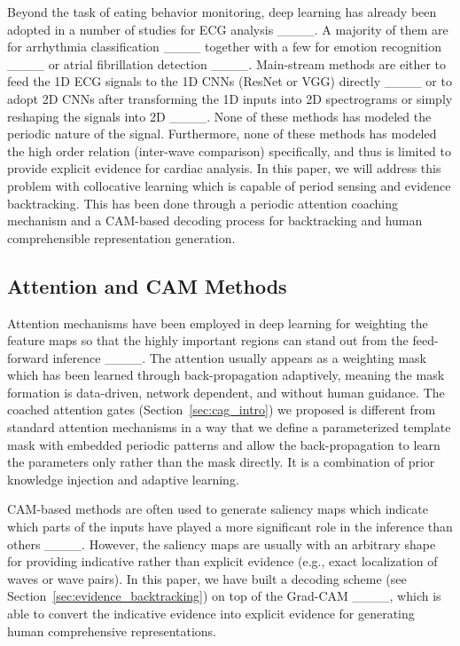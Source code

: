 	Beyond the task of eating behavior monitoring, deep learning has already been adopted in a number of studies for ECG analysis ____. A majority of them are for arrhythmia classification ____ together with a few for emotion recognition ____ or atrial fibrillation detection ____. Main-stream methods are either to feed the 1D ECG signals to the 1D CNNs (ResNet or VGG) directly ____ or to adopt 2D CNNs after transforming the 1D inputs into 2D spectrograms or simply reshaping the signals into 2D ____. 
	None of these methods has modeled the periodic nature of the signal. Furthermore, 
	none of these methods has modeled the high order relation (inter-wave comparison) specifically, and thus is limited to provide explicit evidence for cardiac analysis. 
	In this paper, we will address this problem with collocative learning which is capable of period sensing and evidence backtracking. This has been done through a periodic attention coaching mechanism and a CAM-based decoding process for backtracking and human comprehensible representation generation.
	
	\subsection{Attention and CAM Methods}
	Attention mechanisms have been employed in deep learning for weighting the feature maps so that the highly important regions can stand out from the feed-forward inference ____. The attention usually appears as a weighting mask which has been learned through back-propagation adaptively, meaning the mask formation is data-driven, network dependent, and without human guidance. The coached attention gates (Section~\ref{sec:cag_intro}) we proposed is different from standard attention mechanisms in a way that we define a parameterized template mask with embedded periodic patterns and allow the back-propagation to learn the parameters only rather than the mask directly. It is a combination of prior knowledge injection and adaptive learning.
	
	CAM-based methods are often used to generate saliency maps which indicate which parts of the inputs have played a more significant role in the inference than others ____. However, the saliency maps are usually with an arbitrary shape for providing indicative rather than explicit evidence (e.g., exact localization of waves or wave pairs). In this paper, we have built a decoding scheme (see Section~\ref{sec:evidence_backtracking}) on top of the Grad-CAM ____, which is able to convert the indicative evidence into explicit evidence for generating human comprehensive representations.
	
